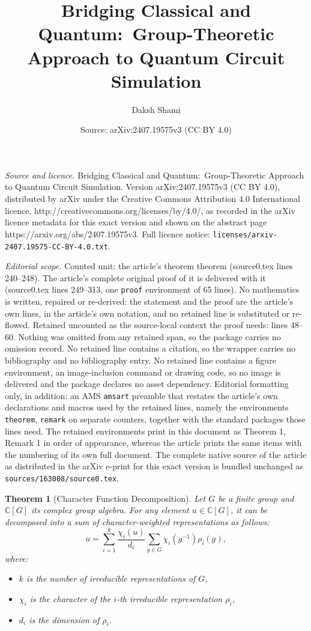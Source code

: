 \documentclass[10pt,a4paper]{amsart}
\title{Bridging Classical and Quantum:\ Group-Theoretic Approach to Quantum Circuit Simulation}
\author{Daksh Shami}
\date{Source: arXiv:2407.19575v3 (CC BY 4.0)}
\newtheorem{theorem}{Theorem}
\begin{document}
\maketitle

\noindent\emph{Source and licence.} Bridging Classical and Quantum:\ Group-Theoretic Approach to Quantum Circuit Simulation. Version arXiv:2407.19575v3 (CC BY 4.0), distributed by arXiv under the Creative Commons Attribution 4.0 International licence, http://creativecommons.org/licenses/by/4.0/, as recorded in the arXiv licence metadata for this exact version and shown on the abstract page https://arxiv.org/abs/2407.19575v3. Full licence notice: \texttt{licenses/arxiv-2407.19575-CC-BY-4.0.txt}.\par\smallskip

\noindent\textit{Editorial scope.} Counted unit: the article's theorem theorem (source0.tex lines 240--248). The article's complete original proof of it is delivered with it (source0.tex lines 249--313, one \texttt{proof} environment of 65 lines). No mathematics is written, repaired or re-derived: the statement and the proof are the article's own lines, in the article's own notation, and no retained line is substituted or re-flowed.  Retained uncounted as the source-local context the proof needs: lines 48--60.  Nothing was omitted from any retained span, so the package carries no omission record.  No retained line contains a citation, so the wrapper carries no bibliography and no bibliography entry.  No retained line contains a figure environment, an image-inclusion command or drawing code, so no image is delivered and the package declares no asset dependency.  Editorial formatting only, in addition: an AMS \texttt{amsart} preamble that restates the article's own declarations and macros used by the retained lines, namely the environments \texttt{theorem}, \texttt{remark} on separate counters, together with the standard packages those lines need.  The retained environments print in this document as Theorem 1, Remark 1 in order of appearance, whereas the article prints the same items with the numbering of its own full document.  The complete native source of the article as distributed in the arXiv e-print for this exact version is bundled unchanged as \texttt{sources/163008/source0.tex}.
\begin{theorem}[Character Function Decomposition]
\label{thm:char_decomp}
Let $G$ be a finite group and $\mathbb{C}[G]$ its complex group algebra. For any element $u \in \mathbb{C}[G]$, it can be decomposed into a sum of character-weighted representations as follows:
\begin{equation}
u = \sum_{i=1}^k \frac{\chi_i(u)}{d_i} \sum_{g \in G} \chi_i(g^{-1}) \rho_i(g),
\end{equation}
where:
\begin{itemize}
    \item $k$ is the number of irreducible representations of $G$,
    \item $\chi_i$ is the character of the $i$-th irreducible representation $\rho_i$,
    \item $d_i$ is the dimension of $\rho_i$.
\end{itemize}
\end{theorem}
\end{document}
